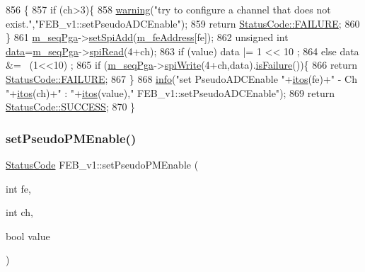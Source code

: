 \begin{DoxyCode}
856                                                                  \{
857   \textcolor{keywordflow}{if} (ch>3)\{
858     \hyperlink{classObject_a65cd4fda577711660821fd2cd5a3b4c9}{warning}(\textcolor{stringliteral}{"try to configure a channel that does not exist."},\textcolor{stringliteral}{"FEB\_v1::setPseudoADCEnable"});
859     \textcolor{keywordflow}{return} \hyperlink{classStatusCode_a6f565cbeadc76d14c72f047e5e85eb4ba3da73d4c469762eb9d3c960368252b26}{StatusCode::FAILURE};
860   \}
861   \hyperlink{classFEB__v1_a6c7804ac86796f233a8393043adf2e77}{m\_seqPga}->\hyperlink{classSeqPGA_ac998ce3a6d9b5f2e88cc8393f8c1df53}{setSpiAdd}(\hyperlink{classFEB__v1_a4e1945c2d5b434125f375e9d0fc6d99f}{m\_feAddress}[fe]);
862   \textcolor{keywordtype}{unsigned} \textcolor{keywordtype}{int} \hyperlink{classFEB__v1_a6bca4320bd3bbbc32efc81097f33421a}{data}=\hyperlink{classFEB__v1_a6c7804ac86796f233a8393043adf2e77}{m\_seqPga}->\hyperlink{classSeqPGA_ab3d0e5e5d4014bc7a92588a76b8713d4}{spiRead}(4+ch);
863   \textcolor{keywordflow}{if} (value)  data |= 1 << 10 ;
864   \textcolor{keywordflow}{else}        data &= ~(1<<10) ;
865   \textcolor{keywordflow}{if} (\hyperlink{classFEB__v1_a6c7804ac86796f233a8393043adf2e77}{m\_seqPga}->\hyperlink{classSeqPGA_ad4421841ce4ce8b88ad13f63216f0743}{spiWrite}(4+ch,data).\hyperlink{classStatusCode_a5dd22dc6eb2c52fc4cabc58f6dea2eb7}{isFailure}())\{
866     \textcolor{keywordflow}{return} \hyperlink{classStatusCode_a6f565cbeadc76d14c72f047e5e85eb4ba3da73d4c469762eb9d3c960368252b26}{StatusCode::FAILURE};
867   \}
868   \hyperlink{classObject_a644fd329ea4cb85f54fa6846484b84a8}{info}(\textcolor{stringliteral}{"set PseudoADCEnable "}+\hyperlink{Tools_8h_af330027dbdafb9a30768b3613c553e60}{itos}(fe)+\textcolor{stringliteral}{" - Ch "}+\hyperlink{Tools_8h_af330027dbdafb9a30768b3613c553e60}{itos}(ch)+\textcolor{stringliteral}{" : "}+\hyperlink{Tools_8h_af330027dbdafb9a30768b3613c553e60}{itos}(value),\textcolor{stringliteral}{"
      FEB\_v1::setPseudoADCEnable"});
869   \textcolor{keywordflow}{return} \hyperlink{classStatusCode_a6f565cbeadc76d14c72f047e5e85eb4badd0da38d3ba0d922efd1f4619bc37ad8}{StatusCode::SUCCESS};
870 \}
\end{DoxyCode}
\mbox{\label{classFEB__v1_af422c3cf889440d5d49cce51d98b496e}} 
\subsubsection{\texorpdfstring{set\+Pseudo\+P\+M\+Enable()}{setPseudoPMEnable()}}
{\footnotesize\ttfamily \hyperlink{classStatusCode}{Status\+Code} F\+E\+B\+\_\+v1\+::set\+Pseudo\+P\+M\+Enable (\begin{DoxyParamCaption}\item[{int}]{fe,  }\item[{int}]{ch,  }\item[{bool}]{value }\end{DoxyParamCaption})}



